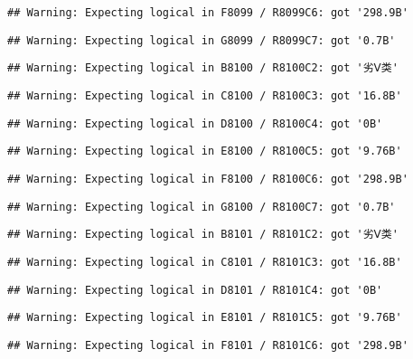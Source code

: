 \documentclass[
]{article}
\begin{document}
\begin{verbatim}
## Warning: Expecting logical in F8099 / R8099C6: got '298.9B'
\end{verbatim}

\begin{verbatim}
## Warning: Expecting logical in G8099 / R8099C7: got '0.7B'
\end{verbatim}

\begin{verbatim}
## Warning: Expecting logical in B8100 / R8100C2: got '劣Ⅴ类'
\end{verbatim}

\begin{verbatim}
## Warning: Expecting logical in C8100 / R8100C3: got '16.8B'
\end{verbatim}

\begin{verbatim}
## Warning: Expecting logical in D8100 / R8100C4: got '0B'
\end{verbatim}

\begin{verbatim}
## Warning: Expecting logical in E8100 / R8100C5: got '9.76B'
\end{verbatim}

\begin{verbatim}
## Warning: Expecting logical in F8100 / R8100C6: got '298.9B'
\end{verbatim}

\begin{verbatim}
## Warning: Expecting logical in G8100 / R8100C7: got '0.7B'
\end{verbatim}

\begin{verbatim}
## Warning: Expecting logical in B8101 / R8101C2: got '劣Ⅴ类'
\end{verbatim}

\begin{verbatim}
## Warning: Expecting logical in C8101 / R8101C3: got '16.8B'
\end{verbatim}

\begin{verbatim}
## Warning: Expecting logical in D8101 / R8101C4: got '0B'
\end{verbatim}

\begin{verbatim}
## Warning: Expecting logical in E8101 / R8101C5: got '9.76B'
\end{verbatim}

\begin{verbatim}
## Warning: Expecting logical in F8101 / R8101C6: got '298.9B'
\end{verbatim}
\end{document}

